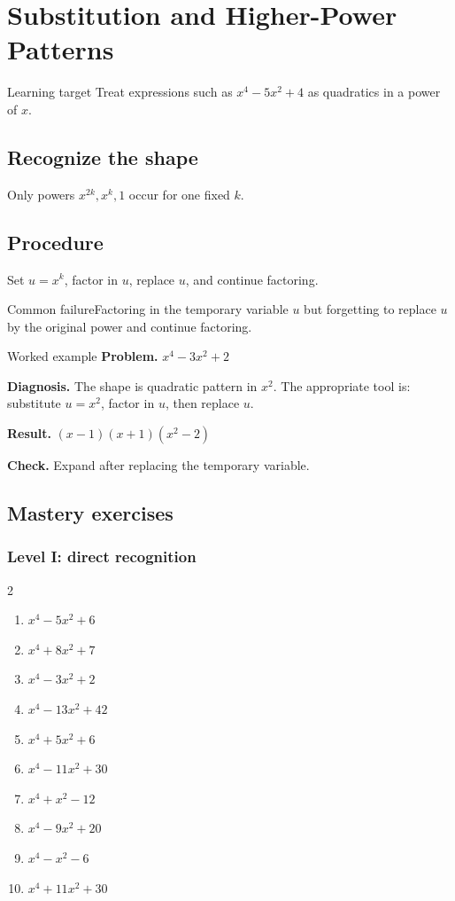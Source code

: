 \documentclass[11pt,oneside]{book}
\begin{document}
\chapter{Substitution and Higher-Power Patterns}
\begin{rulebox}{Learning target}
Treat expressions such as $x^4-5x^2+4$ as quadratics in a power of $x$.
\end{rulebox}
\section{Recognize the shape}
Only powers $x^{2k},x^k,1$ occur for one fixed $k$.
\section{Procedure}
Set $u=x^k$, factor in $u$, replace $u$, and continue factoring.

\begin{warningbox}{Common failure}Factoring in the temporary variable $u$ but forgetting to replace $u$ by the original power and continue factoring.\end{warningbox}
\begin{examplebox}{Worked example}
\textbf{Problem.} $ x^{4} - 3 x^{2} + 2 $

\textbf{Diagnosis.} The shape is quadratic pattern in $x^2$. The appropriate tool is: substitute $u=x^2$, factor in $u$, then replace $u$.

\textbf{Result.} $ \left(x - 1\right) \left(x + 1\right) \left(x^{2} - 2\right) $

\textbf{Check.} Expand after replacing the temporary variable.
\end{examplebox}
\section{Mastery exercises}
\subsection*{Level I: direct recognition}
\begin{multicols}{2}
\begin{enumerate}[leftmargin=*,label=\textbf{\arabic*.},itemsep=0.65\baselineskip]
\item $ x^{4} - 5 x^{2} + 6 $
\item $ x^{4} + 8 x^{2} + 7 $
\item $ x^{4} - 3 x^{2} + 2 $
\item $ x^{4} - 13 x^{2} + 42 $
\item $ x^{4} + 5 x^{2} + 6 $
\item $ x^{4} - 11 x^{2} + 30 $
\item $ x^{4} + x^{2} - 12 $
\item $ x^{4} - 9 x^{2} + 20 $
\item $ x^{4} - x^{2} - 6 $
\item $ x^{4} + 11 x^{2} + 30 $
\end{enumerate}
\end{multicols}
\end{document}
